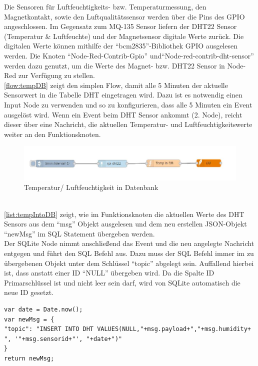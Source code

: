 Die Sensoren für Luftfeuchtigkeits- bzw. Temperaturmessung, den Magnetkontakt, sowie den Luftqualitätssensor werden über die Pins des \ac{GPIO} angeschlossen. Im Gegensatz zum MQ-135 Sensor liefern der DHT22 Sensor (Temperatur \& Luftfeuchte) und der Magnetsensor digitale Werte zurück. Die digitalen Werte können mithilfe der \enquote{bcm2835}-Bibliothek \ac{GPIO} ausgelesen werden\cite{bcm:Bcm}. Die Knoten \enquote{Node-Red-Contrib-Gpio}\cite{node:GPIO} und\enquote{Node-red-contrib-dht-sensor}\cite{node:DHT22} werden dazu genutzt, um die Werte des Magnet- bzw. DHT22 Sensor in Node-Red zur Verfügung zu stellen. 
\\
\autoref{flow:tempDB} zeigt den simplen Flow, damit alle 5 Minuten der aktuelle Sensorwert in die Tabelle DHT eingetragen wird. Dazu ist es notwendig einen Input Node zu verwenden und so zu konfigurieren, dass alle 5 Minuten ein Event ausgelöst wird. Wenn ein Event beim DHT Sensor ankommt (2. Node), reicht dieser über eine Nachricht, die aktuellen Temperatur- und Luftfeuchtigkeitswerte weiter an den Funktionsknoten.
\begin{figure}[h]
	\centering
	\includegraphics[scale=0.7]{images/tempIntoDB}
	\caption{Temperatur/ Luftfeuchtigkeit in Datenbank}
	\label{flow:tempDB}
\end{figure}
\\\autoref{list:tempIntoDB} zeigt, wie im Funktionsknoten die aktuellen Werte des DHT Sensors aus dem \enquote{msg} Objekt ausgelesen und dem neu erstellen \ac{JSON}-Objekt \enquote{newMsg} im \ac{SQL} Statement übergeben werden. \\Der SQLite Node nimmt anschließend das Event und die neu angelegte Nachricht entgegen und führt den \ac{SQL} Befehl  aus. Dazu muss der \ac{SQL} Befehl immer im zu übergebenen Objekt unter dem Schlüssel \enquote{topic} abgelegt sein. Auffallend hierbei ist, dass anstatt einer ID \enquote{NULL} übergeben wird. Da die Spalte ID Primarschlüssel ist und nicht leer sein darf, wird von SQLite automatisch die neue ID gesetzt.
\begin{lstlisting}[label=list:tempIntoDB, caption={Neuer Eintrag in Tabelle DHT}]
var date = Date.now();
var newMsg = {
"topic": "INSERT INTO DHT VALUES(NULL,"+msg.payload+","+msg.humidity+ ", '"+msg.sensorid+"', "+date+")"
}
return newMsg;
\end{lstlisting}
